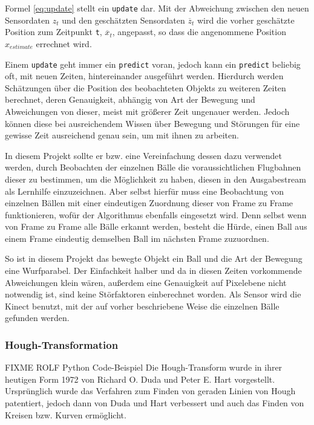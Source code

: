 \documentclass[12pt,a4paper,ngerman]{scrartcl}
\begin{document}
Formel \eqref{eq:update} stellt ein {\tt update} dar. Mit der Abweichung zwischen den neuen Sensordaten $z_{t}$ und den geschätzten Sensordaten $\overline{z}_{t}$ wird die vorher geschätzte Position zum Zeitpunkt {\tt t}, $\overline{x}_{t}$, angepasst, so dass die angenommene Position $x_{estimate}$ errechnet wird.

Einem {\tt update} geht immer ein {\tt predict} voran, jedoch kann ein {\tt predict} beliebig oft, mit neuen Zeiten, hintereinander ausgeführt werden. Hierdurch werden Schätzungen über die Position des beobachteten Objekts zu weiteren Zeiten berechnet, deren Genauigkeit, abhängig von Art der Bewegung und Abweichungen von dieser, meist mit größerer Zeit ungenauer werden. Jedoch können diese bei ausreichendem Wissen über Bewegung und Störungen für eine gewisse Zeit ausreichend genau sein, um mit ihnen zu arbeiten.

In diesem Projekt sollte er bzw. eine Vereinfachung dessen dazu verwendet werden, durch Beobachten der einzelnen Bälle die voraussichtlichen Flugbahnen dieser zu bestimmen, um die Möglichkeit zu haben, diesen in den Ausgabestream als Lernhilfe einzuzeichnen. Aber selbst hierfür muss eine Beobachtung von einzelnen Bällen mit einer eindeutigen Zuordnung dieser von Frame zu Frame funktionieren, wofür der Algorithmus ebenfalls eingesetzt wird. Denn selbst wenn von Frame zu Frame alle Bälle erkannt werden, besteht die Hürde, einen Ball aus einem Frame eindeutig demselben Ball im nächsten Frame zuzuordnen.

So ist in diesem Projekt das bewegte Objekt ein Ball und die Art der Bewegung eine Wurfparabel. Der Einfachkeit halber und da in diesen Zeiten vorkommende Abweichungen klein wären, außerdem eine Genauigkeit auf Pixelebene nicht notwendig ist, sind keine Störfaktoren einberechnet worden. Als Sensor wird die Kinect benutzt, mit der auf vorher beschriebene Weise die einzelnen Bälle gefunden werden.

\subsubsection{Hough-Transformation}
\label{sec:hough}
{\color{red} FIXME ROLF Python Code-Beispiel}
Die Hough-Transform wurde in ihrer heutigen Form 1972 von Richard O. Duda und Peter E. Hart\cite{hough} vorgestellt.\\
Ursprünglich wurde das Verfahren zum Finden von geraden Linien von Hough patentiert, jedoch dann von Duda und Hart verbessert und auch das Finden von Kreisen bzw. Kurven ermöglicht.
\end{document}
